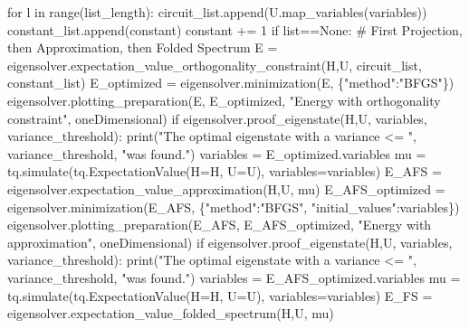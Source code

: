 \documentclass[
  letterpaper,
  DIV=11,
  numbers=noendperiod]{scrartcl}
\newenvironment{Shaded}{\begin{snugshade}}{\end{snugshade}}
\newcommand{\BuiltInTok}[1]{\textcolor[rgb]{0.00,0.23,0.31}{#1}}
\newcommand{\CommentTok}[1]{\textcolor[rgb]{0.37,0.37,0.37}{#1}}
\newcommand{\ControlFlowTok}[1]{\textcolor[rgb]{0.00,0.23,0.31}{#1}}
\newcommand{\DecValTok}[1]{\textcolor[rgb]{0.68,0.00,0.00}{#1}}
\newcommand{\KeywordTok}[1]{\textcolor[rgb]{0.00,0.23,0.31}{#1}}
\newcommand{\NormalTok}[1]{\textcolor[rgb]{0.00,0.23,0.31}{#1}}
\newcommand{\OperatorTok}[1]{\textcolor[rgb]{0.37,0.37,0.37}{#1}}
\newcommand{\StringTok}[1]{\textcolor[rgb]{0.13,0.47,0.30}{#1}}
\newcommand{\VariableTok}[1]{\textcolor[rgb]{0.07,0.07,0.07}{#1}}
\begin{document}
\begin{Shaded}
\begin{Highlighting}[]
    \ControlFlowTok{for}\NormalTok{ l }\KeywordTok{in} \BuiltInTok{range}\NormalTok{(list\_length):}
\NormalTok{        circuit\_list.append(U.map\_variables(variables))}
\NormalTok{        constant\_list.append(constant)}
\NormalTok{        constant }\OperatorTok{+=} \DecValTok{1}
    \ControlFlowTok{if} \BuiltInTok{list}\OperatorTok{==}\VariableTok{None}\NormalTok{:}
        \CommentTok{\# First Projection, then Approximation, then Folded Spectrum}
\NormalTok{        E }\OperatorTok{=}\NormalTok{ eigensolver.expectation\_value\_orthogonality\_constraint(H,U, circuit\_list, constant\_list)}
\NormalTok{        E\_optimized }\OperatorTok{=}\NormalTok{ eigensolver.minimization(E, \{}\StringTok{"method"}\NormalTok{:}\StringTok{"BFGS"}\NormalTok{\})}
\NormalTok{        eigensolver.plotting\_preparation(E, E\_optimized, }\StringTok{"Energy with orthogonality constraint"}\NormalTok{, oneDimensional)}
        \ControlFlowTok{if}\NormalTok{ eigensolver.proof\_eigenstate(H,U, variables, variance\_threshold):}
                \BuiltInTok{print}\NormalTok{(}\StringTok{"The optimal eigenstate with a variance \textless{}= "}\NormalTok{, variance\_threshold, }\StringTok{"was found."}\NormalTok{)}
\NormalTok{        variables }\OperatorTok{=}\NormalTok{ E\_optimized.variables}
\NormalTok{        mu }\OperatorTok{=}\NormalTok{ tq.simulate(tq.ExpectationValue(H}\OperatorTok{=}\NormalTok{H, U}\OperatorTok{=}\NormalTok{U), variables}\OperatorTok{=}\NormalTok{variables)}
\NormalTok{        E\_AFS }\OperatorTok{=}\NormalTok{ eigensolver.expectation\_value\_approximation(H,U, mu)}
\NormalTok{        E\_AFS\_optimized }\OperatorTok{=}\NormalTok{ eigensolver.minimization(E\_AFS, \{}\StringTok{"method"}\NormalTok{:}\StringTok{"BFGS"}\NormalTok{, }\StringTok{"initial\_values"}\NormalTok{:variables\})}
\NormalTok{        eigensolver.plotting\_preparation(E\_AFS, E\_AFS\_optimized, }\StringTok{"Energy with approximation"}\NormalTok{, oneDimensional)}
        \ControlFlowTok{if}\NormalTok{ eigensolver.proof\_eigenstate(H,U, variables, variance\_threshold):}
                \BuiltInTok{print}\NormalTok{(}\StringTok{"The optimal eigenstate with a variance \textless{}= "}\NormalTok{, variance\_threshold, }\StringTok{"was found."}\NormalTok{)}
\NormalTok{        variables }\OperatorTok{=}\NormalTok{ E\_AFS\_optimized.variables}
\NormalTok{        mu }\OperatorTok{=}\NormalTok{ tq.simulate(tq.ExpectationValue(H}\OperatorTok{=}\NormalTok{H, U}\OperatorTok{=}\NormalTok{U), variables}\OperatorTok{=}\NormalTok{variables)}
\NormalTok{        E\_FS }\OperatorTok{=}\NormalTok{ eigensolver.expectation\_value\_folded\_spectrum(H,U, mu)}

\end{Highlighting}
\end{Shaded}
\end{document}
